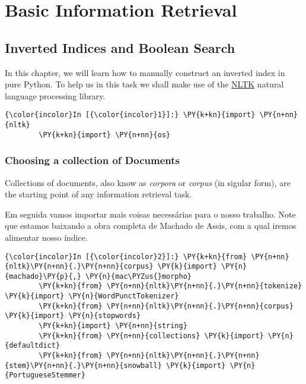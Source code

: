 \chapter{Basic Information Retrieval}

    
    

    
    \section{Inverted Indices and Boolean
Search}\label{inverted-indices-and-boolean-search}

In this chapter, we will learn how to manually construct an inverted
index in pure Python. To help us in this task we shall make use of the
\href{http://nltk.org}{NLTK} natural language processing library.

    \begin{Verbatim}[commandchars=\\\{\}]
{\color{incolor}In [{\color{incolor}1}]:} \PY{k+kn}{import} \PY{n+nn}{nltk}
        \PY{k+kn}{import} \PY{n+nn}{os}
\end{Verbatim}

    \subsection{Choosing a collection of
Documents}\label{choosing-a-collection-of-documents}

Collections of documents, also know as \emph{corpora} or \emph{corpus}
(in sigular form), are the starting point of any information retrieval
task.

Em seguida vamos importar mais coisas necessárias para o nosso trabalho.
Note que estamos baixando a obra completa de Machado de Assis, com a
qual iremos alimentar nosso índice.

    \begin{Verbatim}[commandchars=\\\{\}]
{\color{incolor}In [{\color{incolor}2}]:} \PY{k+kn}{from} \PY{n+nn}{nltk}\PY{n+nn}{.}\PY{n+nn}{corpus} \PY{k}{import} \PY{n}{machado}\PY{p}{,} \PY{n}{mac\PYZus{}morpho}
        \PY{k+kn}{from} \PY{n+nn}{nltk}\PY{n+nn}{.}\PY{n+nn}{tokenize} \PY{k}{import} \PY{n}{WordPunctTokenizer}
        \PY{k+kn}{from} \PY{n+nn}{nltk}\PY{n+nn}{.}\PY{n+nn}{corpus} \PY{k}{import} \PY{n}{stopwords}
        \PY{k+kn}{import} \PY{n+nn}{string}
        \PY{k+kn}{from} \PY{n+nn}{collections} \PY{k}{import} \PY{n}{defaultdict}
        \PY{k+kn}{from} \PY{n+nn}{nltk}\PY{n+nn}{.}\PY{n+nn}{stem}\PY{n+nn}{.}\PY{n+nn}{snowball} \PY{k}{import} \PY{n}{PortugueseStemmer}
\end{Verbatim}

